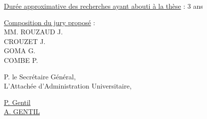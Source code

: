 \uline{Durée approximative des recherches ayant abouti à la thèse} : 3 ans

\uline{Composition du jury proposé} :\\
MM. ROUZAUD J.\\
\hspace*{2em}CROUZET J.\\
\hspace*{2em}GOMA G.\\
\hspace*{2em}COMBE P.

P. le Secrétaire Général,\\
L'Attachée d'Administration Universitaire,

\uline{P. Gentil}\\
\uline{A. GENTIL}



